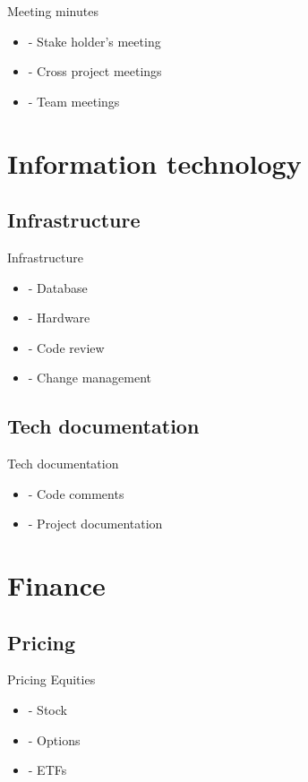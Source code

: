 \documentclass{beamer}
\begin{document}
\begin{frame}{Meeting minutes}
  \begin{itemize}
  \item
- Stake holder's meeting
  \item
- Cross project meetings
  \item
- Team meetings
  \end{itemize}
\end{frame}

\section{Information technology}
\subsection{Infrastructure}

\begin{frame}{Infrastructure}
  \begin{itemize}
  \item
- Database 
  \item
- Hardware 
  \item
- Code review
  \item
- Change management 
  \end{itemize}
\end{frame}

\subsection{Tech documentation}

\begin{frame}{Tech documentation}
  \begin{itemize}
  \item
- Code comments
  \item
- Project documentation 
  \end{itemize}
\end{frame}

\section{Finance}
\subsection{Pricing}

\begin{frame}{Pricing}
Equities
  \begin{itemize}
  \item
- Stock 
  \item
- Options 
  \item
- ETFs
  \end{itemize}
\end{frame}
\end{document}
